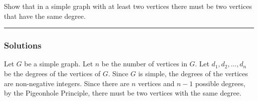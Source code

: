 \begin{question}
Show that in a simple graph with at least two vertices there must be two vertices that have the same degree.
\end{question}

\par\noindent\rule{\textwidth}{0.5pt}

\subsubsection*{Solutions}


Let $G$ be a simple graph. Let $n$ be the number of vertices in $G$. Let $d_1, d_2, \ldots, d_n$ be the degrees of the vertices of $G$. Since $G$ is simple, the degrees of the vertices are non-negative integers. Since there are $n$ vertices and $n-1$ possible degrees, by the Pigeonhole Principle, there must be two vertices with the same degree.
